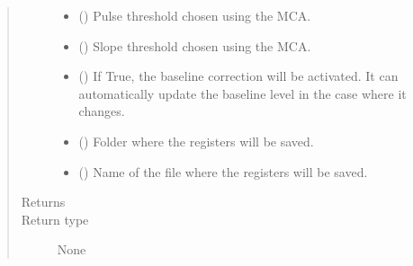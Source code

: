 \documentclass[letterpaper,10pt,english]{sphinxmanual}
\begin{document}
\begin{fulllineitems}
\begin{quote}
\begin{description}
\begin{itemize}
\item {} 
\sphinxAtStartPar
{} () \textendash{} Pulse threshold chosen using the MCA.

\item {} 
\sphinxAtStartPar
{} () \textendash{} Slope threshold chosen using the MCA.

\item {} 
\sphinxAtStartPar
{} () \textendash{} If True, the baseline correction will be activated.
It can automatically update the baseline level in
the case where it changes.

\item {} 
\sphinxAtStartPar
{} () \textendash{} Folder where the registers will be saved.

\item {} 
\sphinxAtStartPar
{} () \textendash{} Name of the file where the registers will be saved.

\end{itemize}

\item[{Returns}] \leavevmode
\sphinxAtStartPar


\item[{Return type}] \leavevmode
\sphinxAtStartPar
None

\end{description}\end{quote}

\end{fulllineitems}

\end{document}
